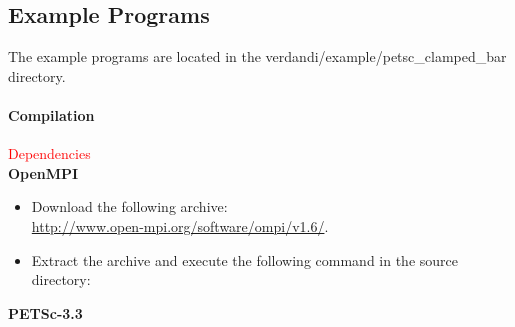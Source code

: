 \hypertarget{seq-par-ep}{}\subsection{Example Programs}\label{seq-par-ep}

The example programs are located in the  verdandi/example/petsc\_clamped\_bar directory.


\hypertarget{seq-par-ep-c}{}\paragraph{Compilation}\label{seq-par-ep-c}


\par \textcolor{red}{Dependencies}\\


\textbf{OpenMPI}\\

\begin{itemize}

\item Download the following archive:\\
\href{http://www.open-mpi.org/software/ompi/v1.6/}{http://www.open-mpi.org/software/ompi/v1.6/}.

\item  Extract the archive and execute the following command in the source directory:


\end{itemize}


\textbf{PETSc-3.3}\\

